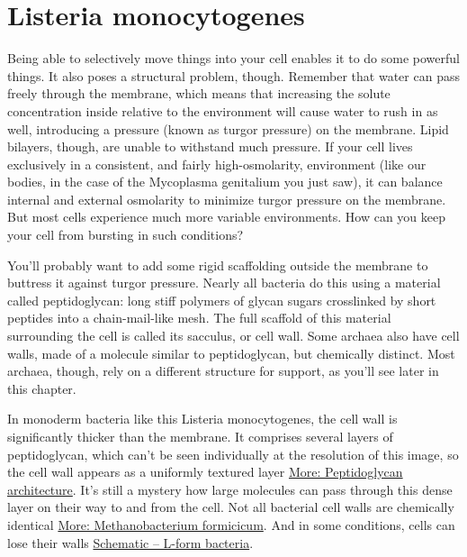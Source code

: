 \documentclass[]{tufte-book}
\begin{document}
\section{Listeria monocytogenes}\label{listeria-monocytogenes}

Being able to selectively move things into your cell enables it to do
some powerful things. It also poses a structural problem, though.
Remember that water can pass freely through the membrane, which means
that increasing the solute concentration inside relative to the
environment will cause water to rush in as well, introducing a pressure
(known as turgor pressure) on the membrane. Lipid bilayers, though, are
unable to withstand much pressure. If your cell lives exclusively in a
consistent, and fairly high-osmolarity, environment (like our bodies, in
the case of the Mycoplasma genitalium you just saw), it can balance
internal and external osmolarity to minimize turgor pressure on the
membrane. But most cells experience much more variable environments. How
can you keep your cell from bursting in such conditions?

You'll probably want to add some rigid scaffolding outside the membrane
to buttress it against turgor pressure. Nearly all bacteria do this
using a material called peptidoglycan: long stiff polymers of glycan
sugars crosslinked by short peptides into a chain-mail-like mesh. The
full scaffold of this material surrounding the cell is called its
sacculus, or cell wall. Some archaea also have cell walls, made of a
molecule similar to peptidoglycan, but chemically distinct. Most
archaea, though, rely on a different structure for support, as you'll
see later in this chapter.

In monoderm bacteria like this Listeria monocytogenes, the cell wall is
significantly thicker than the membrane. It comprises several layers of
peptidoglycan, which can't be seen individually at the resolution of
this image, so the cell wall appears as a uniformly textured layer
\protect\hyperlink{Peptidoglycan_architecture}{More: Peptidoglycan
architecture}. It's still a mystery how large molecules can pass through
this dense layer on their way to and from the cell. Not all bacterial
cell walls are chemically identical \protect\hyperlink{}{More:
Methanobacterium formicicum}. And in some conditions, cells can lose
their walls \protect\hyperlink{L-form_bacteria}{Schematic -- L-form
bacteria}.
\end{document}
